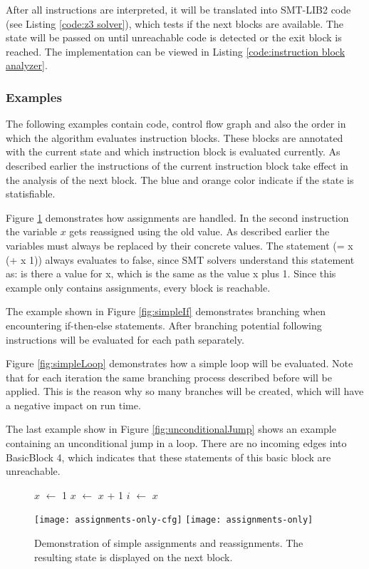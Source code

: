 After all instructions are interpreted, it will be translated into SMT-LIB2 code (see Listing \ref{code:z3 solver}), which tests if the next blocks are available. 
The state will be passed on until unreachable code is detected or the exit block is reached.
The implementation can be viewed in Listing \ref{code:instruction block analyzer}. 

\subsubsection{Examples}
The following examples contain code, control flow graph and also the order in which the algorithm evaluates instruction blocks. These blocks are annotated with the current state and which instruction block is evaluated currently. As described earlier the instructions of the current instruction block take effect in the analysis of the next block. The blue and orange color indicate if the state is statisfiable.


Figure \ref{fig:assignmentOnly} demonstrates how assignments are handled. In the second instruction the variable $x$ gets reassigned using the old value.
As described earlier the variables must always be replaced by their concrete values. The statement (= x (+ x 1)) always evaluates to false, since SMT solvers understand this statement as: is there a value for x, which is the same as the value x plus 1. 
Since this example only contains assignments, every block is reachable.


The example shown in Figure \ref{fig:simpleIf} demonstrates branching when encountering if-then-else statements. After branching potential following instructions will be evaluated for each path separately. 


Figure \ref{fig:simpleLoop} demonstrates how a simple loop will be evaluated. Note that for each iteration the same branching process described before will be applied. 
This is the reason why so many branches will be created, which will have a negative impact on run time.


The last example show in Figure \ref{fig:unconditionalJump} shows an example containing an unconditional jump in a loop. There are no incoming edges into BasicBlock 4, which indicates that these statements of this basic block are unreachable.

\begin{figure}[h!]
	\begin{GenericCode}
$x$ $\leftarrow$ 1
$x$ $\leftarrow$ $x$ + 1
$i$ $\leftarrow$ $x$\end{GenericCode}
	\centering
	\texttt{[image: assignments-only-cfg]}
	\texttt{[image: assignments-only]}
	\caption{Demonstration of simple assignments and reassignments. The resulting state is displayed on the next block.}
	\label{fig:assignmentOnly}
\end{figure}

